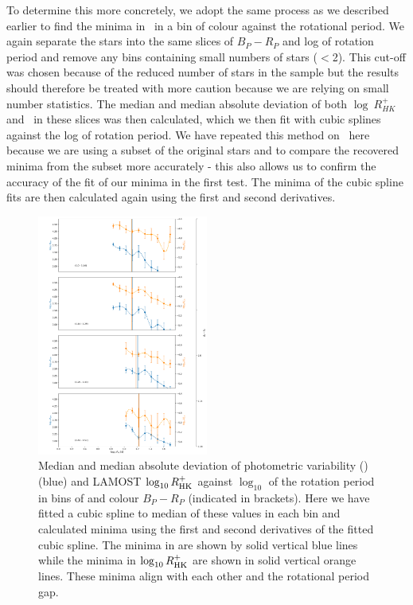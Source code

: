 To determine this more concretely, we adopt the same process as we described earlier to find the minima in \rper{} \ in a bin of colour against the rotational period.
We again separate the stars into the same slices of $B_P-R_P$ and log of rotation period and remove any bins containing small numbers of stars ($<$2).
This cut-off was chosen because of the reduced number of stars in the sample but the results should therefore be treated with more caution because we are relying on small number statistics.
The median and median absolute deviation of both $\log \ R^{+}_{HK}$ and \rper{} \ in these slices was then calculated, which we then fit with cubic splines against the log of rotation period.
We have repeated this method on \rper{} \ here because we are using a subset of the original stars and to compare the recovered minima from the subset more accurately - this also allows us to confirm the accuracy of the fit of our minima in the first test.
The minima of the cubic spline fits are then calculated again using the first and second derivatives.

\begin{figure}
\centering
    \includegraphics[width=0.5\textwidth]{Figures/rot_gap_figures/rot_vs_rper_rhk_minima.png}
    \caption{
    Median and median absolute deviation of photometric variability (\rper{}) (blue) and LAMOST $\log_{10}R^{+}_{\rm{HK}}$ against $\log_10$ of the rotation period in bins of and colour \gaia{} $B_P-R_P$ (indicated in brackets). Here we have fitted a cubic spline to median of these values in each bin and calculated minima using the first and second derivatives of the fitted cubic spline. The minima in \rper{} are shown by solid vertical blue lines while the minima in $\log_{10}R^{+}_{\rm{HK}}$ are shown in solid vertical orange lines. These minima align with each other and the rotational period gap.}
    \label{fig:rot_rper_rhk}
\end{figure}

